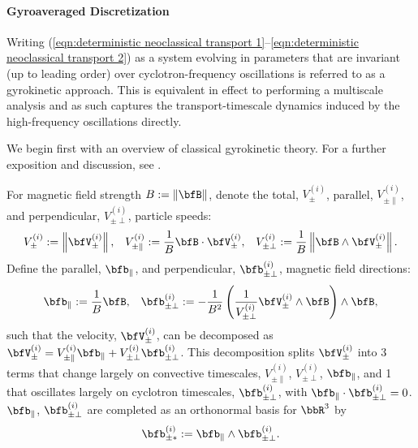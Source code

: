 \paragraph*{Gyroaveraged Discretization}
    Writing (\ref{eqn:deterministic neoclassical transport 1}--\ref{eqn:deterministic neoclassical transport 2}) as a system evolving in parameters that are invariant (up to leading order) over cyclotron-frequency oscillations is referred to as a gyrokinetic approach. This is equivalent in effect to performing a multiscale analysis \cite{Kevorkin_Cole_2012} and as such captures the transport-timescale dynamics induced by the high-frequency oscillations directly.
    
    We begin first with an overview of classical gyrokinetic theory. For a further exposition and discussion, see \cite{Woods_2006, Freidberg_2008, Chen_2015}.

    \shortline

    For magnetic field strength $B  :=  \|\bfB\|$, denote the total, $V_{\pm}^{(i)}$, parallel, $V_{\pm\parallel}^{(i)}$, and perpendicular, $V_{\pm\perp}^{(i)}$, particle speeds:
    \begin{align}
                 V_{\pm}^{(i)}  :=  \left\|\bfV_{\pm}^{(i)}\right\|,   &&
        V_{\pm\parallel}^{(i)}  :=  \frac{1}{B}\bfB\cdot\bfV_{\pm}^{(i)},  &&
            V_{\pm\perp}^{(i)}  :=  \frac{1}{B}\left\|\bfB\wedge\bfV_{\pm}^{(i)}\right\|.
    \end{align}
    Define the parallel, $\bfb_{\parallel}$, and perpendicular, $\bfb_{\pm\perp}^{(i)}$, magnetic field directions:
    \begin{align}
        \bfb_{\parallel}  :=  \frac{1}{B}\bfB,  &&
            \bfb_{\pm\perp}^{(i)}  :=  - \frac{1}{B^{2}}\left(\frac{1}{V_{\pm\perp}^{(i)}}\bfV_{\pm}^{(i)}\wedge\bfB\right)\wedge\bfB,
    \end{align}
    such that the velocity, $\bfV_{\pm}^{(i)}$, can be decomposed as $\bfV_{\pm}^{(i)}  =  V_{\pm\parallel}^{(i)}\bfb_{\parallel} + V_{\pm\perp}^{(i)}\bfb_{\pm\perp}^{(i)}$. This decomposition splits $\bfV_{\pm}^{(i)}$ into 3 terms that change largely on convective timescales, $V_{\pm\parallel}^{(i)}$, $V_{\pm\perp}^{(i)}$, $\bfb_{\parallel}$, and 1 that oscillates largely on cyclotron timescales, $\bfb_{\pm\perp}^{(i)}$, with $\bfb_{\parallel}\cdot\bfb_{\pm\perp}^{(i)}  =  0$. $\bfb_{\parallel}$, $\bfb_{\pm\perp}^{(i)}$ are completed as an orthonormal basis for $\bbR^{3}$ by
    \begin{equation}
        \bfb_{\pm*}^{(i)}  :=  \bfb_{\parallel}\wedge\bfb_{\pm\perp}^{(i)}.
    \end{equation}

